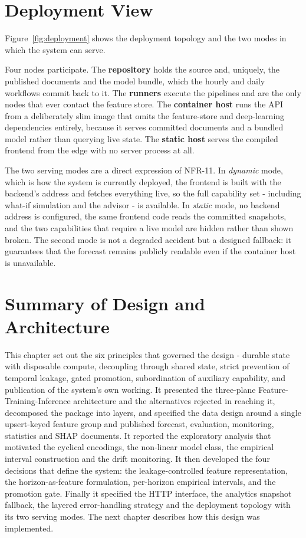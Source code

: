 \section{Deployment View}
Figure~\ref{fig:deployment} shows the deployment topology and the two modes in
which the system can serve.


Four nodes participate. The \textbf{repository} holds the source and, uniquely,
the published documents and the model bundle, which the hourly and daily workflows commit
back to it. The \textbf{runners} execute the pipelines and are the only nodes that
ever contact the feature store. The \textbf{container host} runs the API from a
deliberately slim image that omits the feature-store and deep-learning
dependencies entirely, because it serves committed documents and a bundled model
rather than querying live state. The \textbf{static host} serves the compiled
frontend from the edge with no server process at all.

The two serving modes are a direct expression of NFR-11. In \emph{dynamic} mode,
which is how the system is currently deployed, the frontend is built with the
backend's address and fetches everything live, so the full capability set -
including what-if simulation and the advisor - is available. In \emph{static}
mode, no backend address is configured, the same frontend code reads the
committed snapshots, and the two capabilities that require a live model are
hidden rather than shown broken. The second mode is not a degraded accident but a
designed fallback: it guarantees that the forecast remains publicly readable even
if the container host is unavailable.

\section{Summary of Design and Architecture}
This chapter set out the six principles that governed the design - durable state
with disposable compute, decoupling through shared state, strict prevention of
temporal leakage, gated promotion, subordination of auxiliary capability, and
publication of the system's own working. It presented the three-plane
Feature-Training-Inference architecture and the alternatives rejected in
reaching it, decomposed the package into layers, and specified the data design
around a single upsert-keyed feature group and published forecast, evaluation,
monitoring, statistics and SHAP documents. It
reported the exploratory analysis that motivated the cyclical encodings, the
non-linear model class, the empirical interval construction and the drift
monitoring. It then developed the four decisions that define the system: the
leakage-controlled feature representation, the horizon-as-feature formulation,
per-horizon empirical intervals, and the promotion gate. Finally it specified the
HTTP interface, the analytics snapshot fallback, the layered error-handling strategy and the deployment topology
with its two serving modes. The next chapter describes how this design was
implemented.
